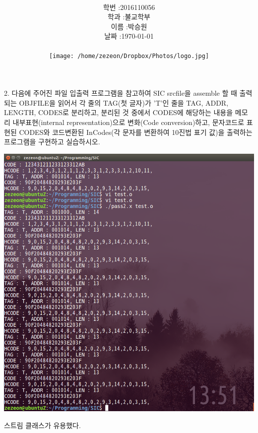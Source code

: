 \documentclass[12pt,a4paper]{article}
\title{
	\centering
	\pgfornament[width=12cm,color=teal]{84}\\
	\vspace{1cm}
	\fontsize{50}{50} \selectfont {시스템 S/W 실습7}\\
	\pgfornament[width=12cm,color=teal]{88}\\
	\vfill}
\author{
	\LARGE
	\begin{tabular}{rl}
		\hline
		학번 : & 2016110056\\ 
		학과 : & 불교학부 \\
		이름 : & 박승원\\
		날짜 : & \today\\
		\hline
	\end{tabular}\vspace{2cm}
	\\
	\texttt{[image: /home/zezeon/Dropbox/Photos/logo.jpg]}
}
\date{}
\begin{document}
\maketitle
\newpage
\noindent
\lstset{columns=flexible, tabsize=4, frame=single, showstringspaces=false, breaklines=true, upquote=true}

\lstset{language=C++}
2. 다음에 주어진 파일 입출력 프로그램을 참고하여 SIC srcfile을 assemble 할 때 출력되는 OBJFILE을 읽어서 각 줄의 TAG(첫 글자)가 'T'인 줄을 TAG, ADDR, LENGTH, CODES로 분리하고, 분리된 것 중에서 CODES에 해당하는 내용을 메모리 내부표현(internal representation)으로 변화(Code conversion)하고, 문자코드로 표현된 CODES와 코드변환된 InCodes(각 문자를 변환하여 10진법 표기 값)을 출력하는 프로그램을 구현하고 실습하시오.

\vspace{1cm}



\includegraphics[width=\textwidth]{tt.png}

{}
\indent
스트림 클래스가 유용했다. 
\end{document}
